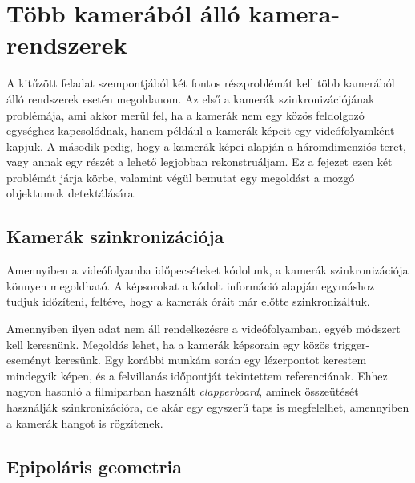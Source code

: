 \chapter{Több kamerából álló kamera-rendszerek \label{chapter2}}

A kitűzött feladat szempontjából két fontos részproblémát kell több kamerából álló rendszerek esetén megoldanom. Az első a kamerák szinkronizációjának problémája, ami akkor merül fel, ha a kamerák nem egy közös feldolgozó egységhez kapcsolódnak, hanem például a kamerák képeit egy videófolyamként kapjuk. A második pedig, hogy a kamerák képei alapján a háromdimenziós teret, vagy annak egy részét a lehető legjobban rekonstruáljam. Ez a fejezet ezen két problémát járja körbe, valamint végül bemutat egy megoldást a mozgó objektumok detektálására.


\section{Kamerák szinkronizációja}


Amennyiben a videófolyamba időpecséteket kódolunk, a kamerák szinkronizációja könnyen megoldható. A képsorokat a kódolt információ alapján egymáshoz tudjuk időzíteni, feltéve, hogy a kamerák óráit már előtte szinkronizáltuk.

Amennyiben ilyen adat nem áll rendelkezésre a videófolyamban, egyéb módszert kell keresnünk. Megoldás lehet, ha a kamerák képsorain egy közös trigger-eseményt keresünk. Egy korábbi munkám során \cite{onlab-1} egy lézerpontot kerestem mindegyik képen, és a felvillanás időpontját tekintettem referenciának. Ehhez nagyon hasonló a filmiparban használt \textit{clapperboard}, aminek összeütését használják szinkronizációra, de akár egy egyszerű taps is megfelelhet, amennyiben a kamerák hangot is rögzítenek.


\section{Epipoláris geometria \label{sec:epipolar}}

